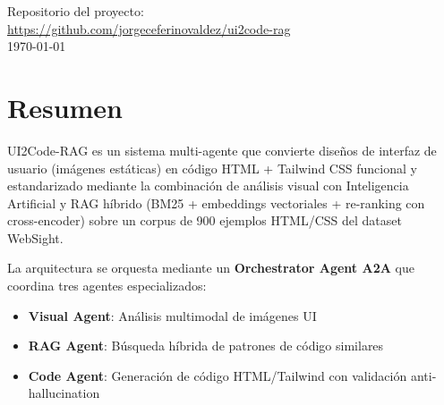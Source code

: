 \documentclass[12pt,a4paper]{article}
\begin{document}
\begin{titlepage}
        {\large Repositorio del proyecto:\\[0.2cm]}
        \url{https://github.com/jorgeceferinovaldez/ui2code-rag}\\[0.5cm]
            {\small \today}


\end{titlepage}

\tableofcontents
\newpage

\section{Resumen}

UI2Code-RAG es un sistema multi-agente que convierte diseños de interfaz de usuario (imágenes estáticas) en código HTML + Tailwind CSS funcional y estandarizado mediante la combinación de análisis visual con Inteligencia Artificial y RAG híbrido (BM25 + embeddings vectoriales + re-ranking con cross-encoder) sobre un corpus de 900 ejemplos HTML/CSS del dataset WebSight.

La arquitectura se orquesta mediante un \textbf{Orchestrator Agent A2A} que coordina tres agentes especializados:
\begin{itemize}
    \item \textbf{Visual Agent}: Análisis multimodal de imágenes UI
    \item \textbf{RAG Agent}: Búsqueda híbrida de patrones de código similares
    \item \textbf{Code Agent}: Generación de código HTML/Tailwind con validación anti-hallucination
\end{itemize}
\end{document}
